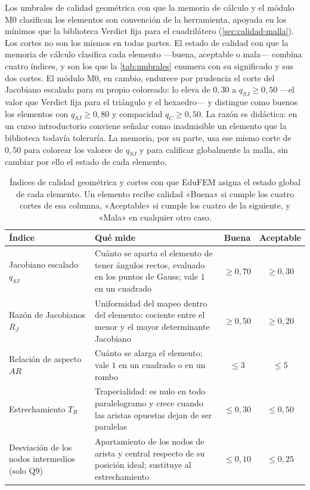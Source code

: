Los umbrales de calidad geométrica con que la memoria de cálculo y el módulo M0 clasifican los elementos son convención de la herramienta, apoyada en los mínimos que la biblioteca Verdict fija para el cuadrilátero (\autoref{sec:calidad-malla}). Los cortes no son los mismos en todas partes. El estado de calidad con que la memoria de cálculo clasifica cada elemento ---buena, aceptable o mala--- combina cuatro índices, y son los que la \autoref{tab:umbrales} enumera con su significado y sus dos cortes. El módulo M0, en cambio, endurece por prudencia el corte del Jacobiano escalado para su propio coloreado: lo eleva de $0{,}30$ a $q_{SJ} \ge 0{,}50$ —el valor que Verdict fija para el triángulo y el hexaedro— y distingue como buenos los elementos con $q_{SJ} \ge 0{,}80$ y compacidad $q_C \ge 0{,}50$. La razón es didáctica: en un curso introductorio conviene señalar como inadmisible un elemento que la biblioteca todavía toleraría. La memoria, por su parte, usa ese mismo corte de $0{,}50$ para colorear los valores de $q_{SJ}$ y para calificar globalmente la malla, sin cambiar por ello el estado de cada elemento.

\begin{table}[H]
\centering
\caption[Índices de calidad geométrica y cortes con que EduFEM clasifica cada elemento.]{Índices de calidad geométrica y cortes con que EduFEM asigna el estado global de cada elemento. Un elemento recibe calidad «Buena» si cumple los cuatro cortes de esa columna, «Aceptable» si cumple los cuatro de la siguiente, y «Mala» en cualquier otro caso.}
\label{tab:umbrales}
\setlength{\tabcolsep}{4pt}
\begin{tabular}{@{}>{\raggedright\arraybackslash}p{3.3cm} >{\raggedright\arraybackslash}p{6.6cm} cc@{}}
\toprule
\textbf{Índice} & \textbf{Qué mide} & \textbf{Buena} & \textbf{Aceptable} \\
\midrule
Jacobiano escalado $q_{SJ}$ & Cuánto se aparta el elemento de tener ángulos rectos, evaluado en los puntos de Gauss; vale $1$ en un cuadrado & $\ge 0{,}70$ & $\ge 0{,}30$ \\
Razón de Jacobianos $R_J$ & Uniformidad del mapeo dentro del elemento: cociente entre el menor y el mayor determinante Jacobiano & $\ge 0{,}50$ & $\ge 0{,}20$ \\
Relación de aspecto $AR$ & Cuánto se alarga el elemento; vale $1$ en un cuadrado o en un rombo & $\le 3$ & $\le 5$ \\
Estrechamiento $T_R$ & Trapecialidad: es nulo en todo paralelogramo y crece cuando las aristas opuestas dejan de ser paralelas & $\le 0{,}30$ & $\le 0{,}50$ \\
\midrule
Desviación de los nodos intermedios (solo Q9) & Apartamiento de los nodos de arista y central respecto de su posición ideal; sustituye al estrechamiento & $\le 0{,}10$ & $\le 0{,}25$ \\
\bottomrule
\end{tabular}
{\singlespacing{}}
\end{table}

